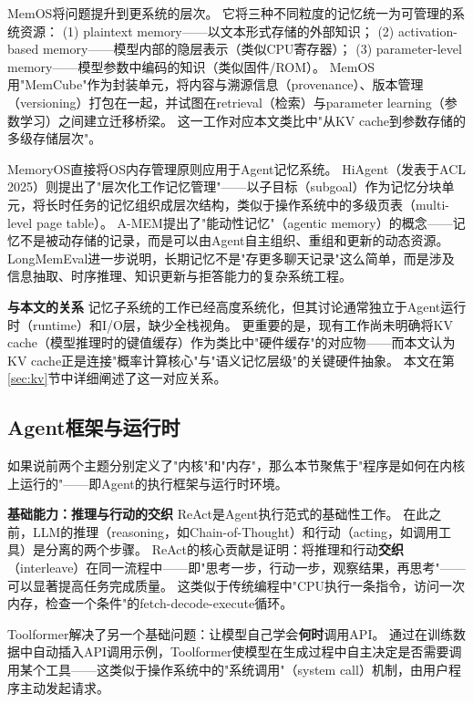 MemOS\cite{memos2025}将问题提升到更系统的层次。
它将三种不同粒度的记忆统一为可管理的系统资源：
(1) plaintext memory——以文本形式存储的外部知识；
(2) activation-based memory——模型内部的隐层表示（类似CPU寄存器）；
(3) parameter-level memory——模型参数中编码的知识（类似固件/ROM）。
MemOS用"MemCube"作为封装单元，将内容与溯源信息（provenance）、版本管理（versioning）打包在一起，并试图在retrieval（检索）与parameter learning（参数学习）之间建立迁移桥梁。
这一工作对应本文类比中"从KV cache到参数存储的多级存储层次"。

MemoryOS\cite{memoryos2025}直接将OS内存管理原则应用于Agent记忆系统。
HiAgent\cite{hiagent2024}（发表于ACL 2025）则提出了"层次化工作记忆管理"——以子目标（subgoal）作为记忆分块单元，将长时任务的记忆组织成层次结构，类似于操作系统中的多级页表（multi-level page table）。
A-MEM\cite{amem2025}提出了"能动性记忆"（agentic memory）的概念——记忆不是被动存储的记录，而是可以由Agent自主组织、重组和更新的动态资源。
LongMemEval\cite{longmemeval2024}进一步说明，长期记忆不是"存更多聊天记录"这么简单，而是涉及信息抽取、时序推理、知识更新与拒答能力的复杂系统工程。

\textbf{与本文的关系}
记忆子系统的工作已经高度系统化，但其讨论通常独立于Agent运行时（runtime）和I/O层，缺少全栈视角。
更重要的是，现有工作尚未明确将KV cache（模型推理时的键值缓存）作为类比中"硬件缓存"的对应物——而本文认为KV cache正是连接"概率计算核心"与"语义记忆层级"的关键硬件抽象。
本文在第\ref{sec:kv}节中详细阐述了这一对应关系。

\subsection{Agent框架与运行时}
\label{sec:related-agent-framework}

如果说前两个主题分别定义了"内核"和"内存"，那么本节聚焦于"程序是如何在内核上运行的"——即Agent的执行框架与运行时环境。

\textbf{基础能力：推理与行动的交织}
ReAct\cite{yao2023react}是Agent执行范式的基础性工作。
在此之前，LLM的推理（reasoning，如Chain-of-Thought）和行动（acting，如调用工具）是分离的两个步骤。
ReAct的核心贡献是证明：将推理和行动\textbf{交织}（interleave）在同一流程中——即"思考一步，行动一步，观察结果，再思考"——可以显著提高任务完成质量。
这类似于传统编程中"CPU执行一条指令，访问一次内存，检查一个条件"的fetch-decode-execute循环。

Toolformer\cite{schick2023toolformer}解决了另一个基础问题：让模型自己学会\textbf{何时}调用API。
通过在训练数据中自动插入API调用示例，Toolformer使模型在生成过程中自主决定是否需要调用某个工具——这类似于操作系统中的"系统调用"（system call）机制，由用户程序主动发起请求。

